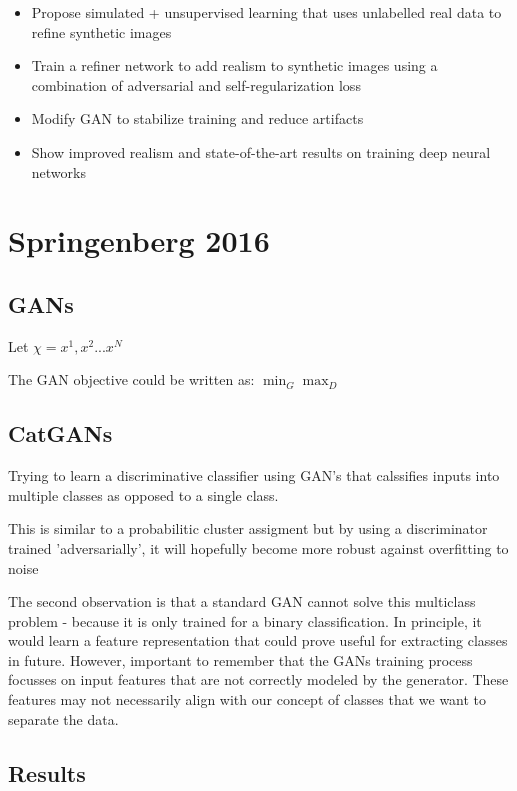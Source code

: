 \documentclass{article}
\begin{document}
\begin{itemize}

    \item Propose simulated + unsupervised learning that uses unlabelled real data to refine synthetic images
    \item Train a refiner network to add realism to synthetic images using a combination of adversarial and self-regularization loss
    \item Modify GAN to stabilize training and reduce artifacts
    \item Show improved realism and state-of-the-art results on training deep neural networks

\end{itemize}

\section{Springenberg 2016}

\subsection{GANs}

Let $\chi = {x^1, x^2 ... x^N}$

The GAN objective could be written as:
$ \min_{G} \max_D $

\subsection{CatGANs}

Trying to learn a discriminative classifier using GAN's that calssifies inputs into multiple classes as opposed to a single class.

This is similar to a probabilitic cluster assigment but by using a discriminator trained 'adversarially', it will hopefully become more robust against overfitting to noise

The second observation is that a standard GAN cannot solve this multiclass problem - because it is only trained for a binary classification. In principle, it would learn a feature representation that could prove useful for extracting classes in future. However, important to remember that the GANs training process focusses on input features that are not correctly modeled by the generator. These features may not necessarily align with our concept of classes that we want to separate the data.

\subsection{Results}
\end{document}
